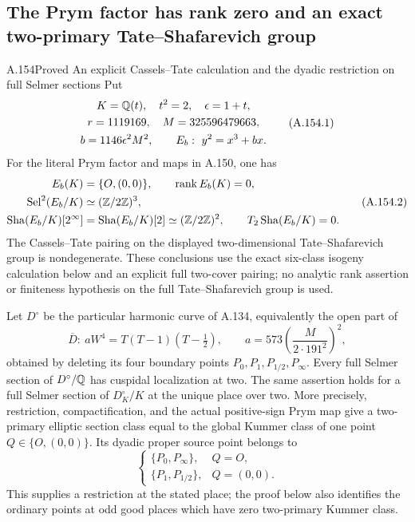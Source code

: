 \subsection{The Prym factor has rank zero and an exact two-primary Tate--Shafarevich group}

\begin{statement}{A.154}{Proved}
{An explicit Cassels--Tate calculation and the dyadic restriction on full Selmer sections}
Put
\[
 \begin{gathered}
 K=\mathbb Q(t),\quad t^2=2,\quad \epsilon=1+t,\\
 r=1119169,\quad M=325596479663,\\
 b=1146\epsilon^2M^2,\qquad E_b:\ y^2=x^3+bx.
 \end{gathered}
\tag{A.154.1}
\]
For the literal Prym factor and maps in A.150, one has
\[
 \begin{split}
 E_b(K)&=\{O,(0,0)\},\qquad \operatorname{rank}E_b(K)=0,\\
 \operatorname{Sel}^{2}(E_b/K)&\simeq(\mathbb Z/2\mathbb Z)^3,\\
 \operatorname{Sha}(E_b/K)[2^\infty]&=\operatorname{Sha}(E_b/K)[2]
                    \simeq(\mathbb Z/2\mathbb Z)^2,\qquad
 T_2\operatorname{Sha}(E_b/K)=0.
 \end{split}
\tag{A.154.2}
\]
The Cassels--Tate pairing on the displayed two-dimensional
Tate--Shafarevich group is nondegenerate.  These conclusions
use the exact six-class isogeny calculation below and an
explicit full two-cover pairing; no analytic rank assertion
or finiteness hypothesis on the full Tate--Shafarevich group
is used.

Let \(D^\circ\) be the particular harmonic curve of A.134,
equivalently the open part of
\[
 \overline D:\ aW^4=T(T-1)(T-\tfrac12),\qquad
 a=573\left(\frac{M}{2\cdot191^2}\right)^2,
\tag{A.154.3}
\]
obtained by deleting its four boundary points
\(P_0,P_1,P_{1/2},P_\infty\).
Every full Selmer section of \(D^\circ/\mathbb Q\) has cuspidal
localization at two.  The same assertion holds for a full
Selmer section of \(D^\circ_K/K\) at the unique place over
two.  More precisely, restriction, compactification, and
the actual positive-sign Prym map give a two-primary
elliptic section class equal to the global Kummer class of
one point \(Q\in\{O,(0,0)\}\).  Its dyadic proper source
point belongs to
\[
 \begin{cases}
 \{P_0,P_\infty\},&Q=O,\\
 \{P_1,P_{1/2}\},&Q=(0,0).
 \end{cases}
\tag{A.154.4}
\]
This supplies a restriction at the stated place; the
proof below also identifies the ordinary points at odd
good places which have zero two-primary Kummer class.
\end{statement}

